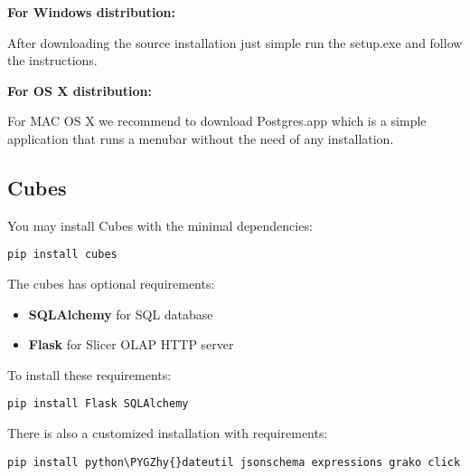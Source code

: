 \documentclass[letterpaper,12pt,oneside]{sphinxmanual}
\def\PYGZhy{\char`\-}
\begin{document}
\textbf{For Windows distribution:} 

After downloading the source installation just simple run the setup.exe and follow the instructions.

\textbf{For OS X distribution:} 

For MAC OS X we recommend to download Postgres.app which is a simple application that runs a menubar without the need of any installation.


\subsection{Cubes}
\label{apendixa:cubes}
You may install Cubes with the minimal dependencies:

\def\SphinxLiteralBlockLabel{\label{apendixa:install-cubes}}
\begin{Verbatim}[commandchars=\\\{\}]
pip install cubes
\end{Verbatim}
\let\SphinxVerbatimTitle\empty
\let\SphinxLiteralBlockLabel\empty

The cubes has optional requirements:
\begin{itemize}
\item {} 
\textbf{SQLAlchemy} for SQL database

\item {} 
\textbf{Flask} for Slicer OLAP HTTP server

\end{itemize}

To install these requirements:

\def\SphinxLiteralBlockLabel{\label{apendixa:cubes-requirements}}
\begin{Verbatim}[commandchars=\\\{\}]
pip install Flask SQLAlchemy
\end{Verbatim}
\let\SphinxVerbatimTitle\empty
\let\SphinxLiteralBlockLabel\empty

There is also a customized installation with requirements:

\def\SphinxLiteralBlockLabel{\label{apendixa:customized-installation}}
\begin{Verbatim}[commandchars=\\\{\}]
pip install python\PYGZhy{}dateutil jsonschema expressions grako click
\end{Verbatim}
\let\SphinxVerbatimTitle\empty
\let\SphinxLiteralBlockLabel\empty
\end{document}
